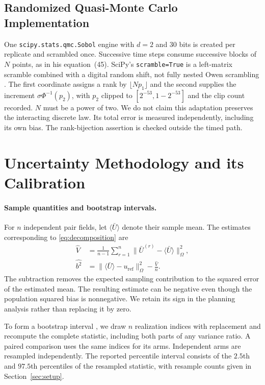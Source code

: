 \documentclass[smallextended,nospthms]{svjour3}
\theoremstyle{plain}
\theoremstyle{definition}
\theoremstyle{remark}
\numberwithin{equation}{section}
\begin{document}
\subsection{Randomized Quasi-Monte Carlo Implementation}
\label{app:rqmc}

One \texttt{scipy.stats.qmc.Sobol} engine with $d=2$ and $30$ bits is created per
replicate and scrambled once. Successive time steps consume successive blocks of
$N$ points, as in his equation~(45). SciPy's \texttt{scramble=True} is a
left-matrix scramble combined with a digital random shift, not fully nested Owen
scrambling \citep{owen1998,virtanen2020}. The first coordinate assigns a rank by
$\lfloor N p_1\rfloor$ and the second supplies the increment
$\sigma\Phi^{-1}(p_2)$, with $p_2$ clipped to $[2^{-53},1-2^{-53}]$ and the clip
count recorded. $N$ must be a power of two. We do not claim this adaptation
preserves the interacting discrete law. Its total error is measured
independently, including its own bias. The rank-bijection assertion is checked outside the timed path.


\section{Uncertainty Methodology and its Calibration}
\label{app:uncertainty}

\paragraph{Sample quantities and bootstrap intervals.}
For $n$ independent pair fields, let $\langle\bar U\rangle$ denote their
sample mean. The estimates corresponding to \eqref{eq:decomposition} are
\[
 \begin{aligned}
 \widehat V&=\frac1{n-1}\sum_{r=1}^n
   \bigl\|\bar U^{(r)}-\langle\bar U\rangle\bigr\|_\Omega^2,\\
 \widehat{b^2}&=\bigl\|\langle\bar U\rangle-u_{\mathrm{ref}}\bigr\|_\Omega^2
   -\frac{\widehat V}{n}.
 \end{aligned}
\]
The subtraction removes the expected sampling contribution to the squared
error of the estimated mean. The resulting estimate can be negative even
though the population squared bias is nonnegative. We retain its sign in
the planning analysis rather than replacing it by zero.

To form a bootstrap interval \citep{efron1981}, we draw $n$ realization
indices with replacement and recompute the complete statistic, including
both parts of any variance ratio. A paired comparison uses the same indices
for its arms. Independent arms are resampled independently. The reported
percentile interval consists of the $2.5$th and $97.5$th percentiles of the
resampled statistic, with resample counts given in Section~\ref{sec:setup}.
\end{document}
